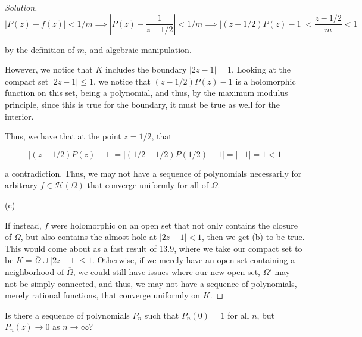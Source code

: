 \documentclass[10pt]{article}
\newenvironment{problem}[2][]{\begin{trivlist}
\item[\hskip \labelsep {\bfseries #1}\hskip \labelsep {\bfseries #2.}]}{\end{trivlist}}
\begin{document}
\begin{proof}[Solution]
$$ |P(z) - f(z)| < 1/m \implies |P(z) -\frac{1}{z - 1/2}| < 1/m \implies |(z - 1/2)P(z) - 1| < \frac{z - 1/2}{m} < 1$$

by the definition of $m$, and algebraic manipulation.

However, we notice that $K$ includes the boundary $| 2z - 1 | = 1$. Looking at the compact set $| 2 z - 1 | \leq 1$, we notice that $(z - 1/2)P(z) - 1$ is a holomorphic function on this set, being a polynomial, and thus, by the maximum modulus principle, since this is true for the boundary, it must be true as well for the interior.

Thus,  we have that at the point $z = 1/2$, that 

$$  |(z - 1/2)P(z) - 1| = |(1/2 - 1/2)P(1/2) - 1| = |-1| = 1 < 1$$

a contradiction. Thus, we may not have a sequence of polynomials necessarily for arbitrary $f \in \mathcal{H}(\Omega)$ that converge uniformly for all of $\Omega$.

(c)

If instead, $f$ were holomorphic on an open set that not only contains the closure of $\Omega$, but also contains the almost hole at $|2z - 1| < 1$, then we get (b) to be true. This would come about as a fast result of 13.9, where we take our compact set to be $K = \overline{\Omega} \cup |2z - 1 | \leq 1$. Otherwise, if we merely have an open set containing a neighborhood of $\overline{\Omega}$, we could still have issues where our new open set, $\Omega'$ may not be simply connected, and thus, we may not have a sequence of polynomials, merely rational functions, that converge uniformly on $K$.

\end{proof}

\begin{problem}{Question 3}

Is there a sequence of polynomials $P_n$ such that $P_n(0) = 1$ for all $n$, but $P_n(z) \to 0$  as $n \to \infty$?

\end{problem}
\end{document}

